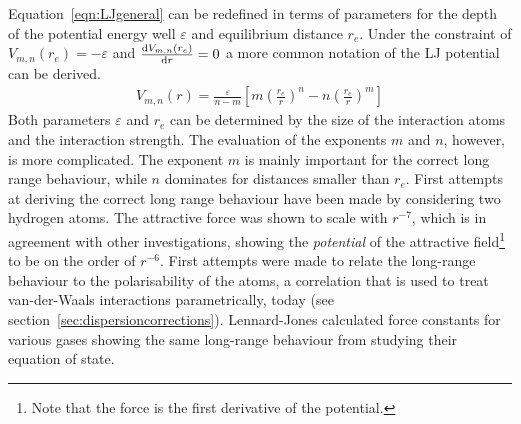 Equation~\ref{eqn:LJgeneral} can be redefined in terms of parameters for the
depth of the potential energy well $\varepsilon$ and equilibrium distance
$r_e$. Under the constraint of $V_{m,n}(r_e)=-\varepsilon$ and
$\dv{V_{m,n}(r_e)}{r}=0$ a more common notation of the \ac{LJ} potential can be
derived.
%
\begin{align}
    V_{m,n}(r)=\frac{\varepsilon}{n-m} \left[ m \left(\frac{r_e}{r}\right)^n  - n\left(\frac{r_e}{r}\right)^m \right]
\end{align}
%
Both parameters $\varepsilon$ and $r_e$ can be determined by the size of the
interaction atoms and the interaction strength. The evaluation of the exponents
$m$ and $n$, however, is more complicated. The exponent $m$ is mainly important
for the correct long range behaviour, while $n$ dominates for distances smaller
than $r_e$. First attempts at deriving the correct long range behaviour have
been made by considering two hydrogen
atoms.\autocite{Wang_gegenseitigeEinwirkungzweier_1927} The attractive force was
shown to scale with $r^{-7}$, which is in agreement with other investigations,
showing the \textit{potential} of the attractive field\footnote{Note that the
force is the first derivative of the potential.} to be on the order of
$r^{-6}$.\autocite{Eisenschitz_UeberVerhaeltnisvan_1930,Lennard-Jones_Perturbationproblemsquantum_1930,Hasse_calculationvanWaal_1931,Slater_VanWaalsForces_1931}
First attempts were made to relate the long-range behaviour to the
polarisability of the
atoms,\autocite{London_ZurTheorieund_1930,Slater_VanWaalsForces_1931} a
correlation that is used to treat van-der-Waals interactions parametrically,
today (see section~\ref{sec:dispersioncorrections}). Lennard-Jones calculated
force constants for various gases showing the same long-range behaviour from
studying their equation of
state.\autocite{Jones_DeterminationMolecularFields_1924,Jones_atomicfieldshelium_1925,Lennard-Jones_theoreticalcalculationsphysical_1925,Lennard-Jones_molecularfieldshydrogen_1926,Lennard-Jones_equationstategaseous_1927}

